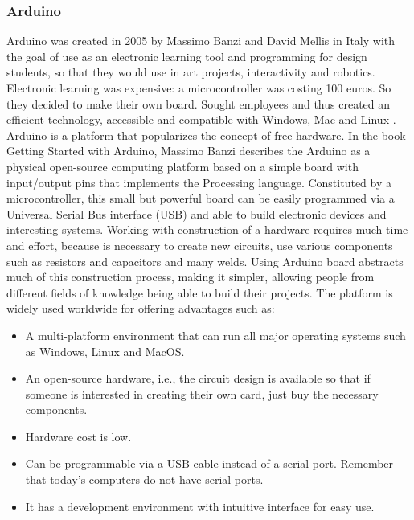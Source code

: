\documentclass{acm_proc_article-sp}
\begin{document}
\subsubsection{Arduino}
Arduino was created in 2005 by Massimo Banzi and David Mellis in Italy with the goal of use as an electronic learning tool and programming for design students, so that they would use in art projects, interactivity and robotics. Electronic learning was expensive: a microcontroller was costing 100 euros. So they decided to make their own board. Sought employees and thus created an efficient technology, accessible and compatible with Windows, Mac and Linux \cite{netodesenvolvimento}.
\newline
\newline
Arduino is a platform that popularizes the concept of free hardware. In the book Getting Started with Arduino, Massimo Banzi describes the Arduino as a physical open-source computing platform based on a simple board with input/output pins that implements the Processing language. Constituted by a microcontroller, this small but powerful board can be easily programmed via a Universal Serial Bus interface (USB) and able to build electronic devices and interesting systems.
\newline
\newline
Working with construction of a hardware requires much time and effort, because is necessary to create new circuits, use various components such as resistors and capacitors and many welds. Using Arduino board abstracts much of this construction process, making it simpler, allowing people from different fields of knowledge being able to build their projects. The platform is widely used worldwide for offering advantages such as:


\begin{itemize}
\item A multi-platform environment that can run all major operating systems such as Windows, Linux and MacOS.
\item An open-source hardware, i.e., the circuit design is available so that if someone is interested in creating their own card, just buy the necessary components.		
\item Hardware cost is low.					
\item Can be programmable via a USB cable instead of a serial port. Remember that today's computers do not have serial ports.	
\item It has a development environment with intuitive interface for easy use.
\end{itemize}
\end{document}
